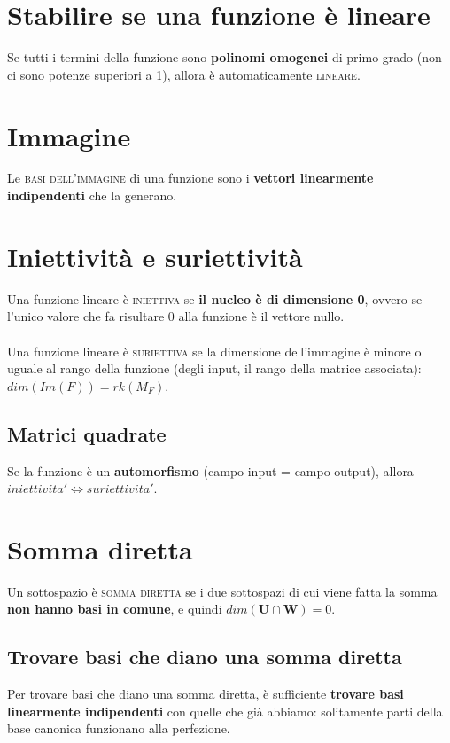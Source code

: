 \documentclass{article}
\begin{document}
\section{Stabilire se una funzione è lineare}

Se tutti i termini della funzione sono \textbf{polinomi omogenei} di primo grado (non ci sono potenze superiori a 1), allora è automaticamente \textsc{lineare}.

\section{Immagine}

Le \textsc{basi dell'immagine} di una funzione sono i \textbf{vettori linearmente indipendenti} che la generano.

\section{Iniettività e suriettività}

Una funzione lineare è \textsc{iniettiva} se \textbf{il nucleo è di dimensione 0}, ovvero se l'unico valore che fa risultare 0 alla funzione è il vettore nullo.\\
\\
Una funzione lineare è \textsc{suriettiva} se la dimensione dell'immagine è minore o uguale al rango della funzione (degli input, il rango della matrice associata): \(dim(Im(F)) = rk(M_F)\).\\

\subsection{Matrici quadrate}

Se la funzione è un \textbf{automorfismo} (campo input = campo output), allora \(iniettivita' \Leftrightarrow suriettivita'\).

\section{Somma diretta}

Un sottospazio è \textsc{somma diretta} se i due sottospazi di cui viene fatta la somma \textbf{non hanno basi in comune}, e quindi \(dim(\pmb{U} \cap \pmb{W}) = 0\).

\subsection{Trovare basi che diano una somma diretta}

Per trovare basi che diano una somma diretta, è sufficiente \textbf{trovare basi linearmente indipendenti} con quelle che già abbiamo: solitamente parti della base canonica funzionano alla perfezione.
\end{document}
